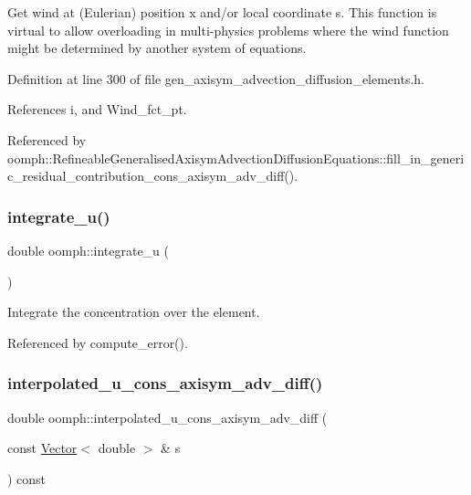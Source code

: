 Get wind at (Eulerian) position x and/or local coordinate s. This function is virtual to allow overloading in multi-\/physics problems where the wind function might be determined by another system of equations. 



Definition at line 300 of file gen\+\_\+axisym\+\_\+advection\+\_\+diffusion\+\_\+elements.\+h.



References i, and Wind\+\_\+fct\+\_\+pt.



Referenced by oomph\+::\+Refineable\+Generalised\+Axisym\+Advection\+Diffusion\+Equations\+::fill\+\_\+in\+\_\+generic\+\_\+residual\+\_\+contribution\+\_\+cons\+\_\+axisym\+\_\+adv\+\_\+diff().

\mbox{\label{namespaceoomph_a816fb1d612ecf4c4f42cecc69d5c636f}} 
\subsubsection{\texorpdfstring{integrate\+\_\+u()}{integrate\_u()}}
{\footnotesize\ttfamily double oomph\+::integrate\+\_\+u (\begin{DoxyParamCaption}{ }\end{DoxyParamCaption})}



Integrate the concentration over the element. 



Referenced by compute\+\_\+error().

\mbox{\label{namespaceoomph_a24e114f1df46d56b50a57474d27e3dbb}} 
\subsubsection{\texorpdfstring{interpolated\+\_\+u\+\_\+cons\+\_\+axisym\+\_\+adv\+\_\+diff()}{interpolated\_u\_cons\_axisym\_adv\_diff()}}
{\footnotesize\ttfamily double oomph\+::interpolated\+\_\+u\+\_\+cons\+\_\+axisym\+\_\+adv\+\_\+diff (\begin{DoxyParamCaption}\item[{const \hyperlink{classoomph_1_1Vector}{Vector}$<$ double $>$ \&}]{s }\end{DoxyParamCaption}) const\hspace{0.3cm}{\ttfamily [inline]}}



